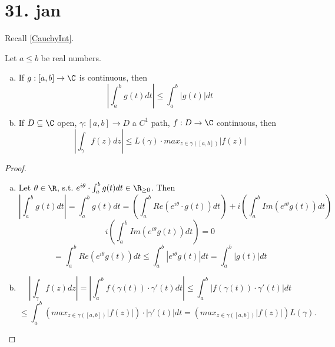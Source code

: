 \section{31. jan}
Recall \ref{CauchyInt}.
\begin{lemma}
  Let $a\leq b $ be real numbers.
  \begin{enumerate}[(a)]
    \item If $g:[a,b]\to \C$ is continuous, then
      $$\left|\int_{a}^{b}g(t)dt\right|\leq \int_{a}^{b}|g(t)|dt$$
    \item If $D\subseteq \C$ open, $\gamma:[a,b]\to D$ a $C^1$ path, $f:D\to \C$ continuous, then
      $$\left|\int_{\gamma}f(z)dz\right|\leq L(\gamma) \cdot max_{z\in \gamma([a,b])}|f(z)|$$
  \end{enumerate}
\end{lemma}
\begin{proof}
  \begin{enumerate}[(a)]
    \item Let $\theta \in \R$, s.t. $e^{i\theta} \cdot \int_{a}^{b}g(t)dt\in \R_{\geq 0}$. Then
      $$\left|\int_{a}^{b}g(t)dt\right|=\int_{a}^{b}g(t)dt=\left(\int_{a}^{b}Re(e^{i\theta} \cdot g(t))dt\right)+i \left(\int_{a}^{b}Im \left(e^{i\theta}g(t)\right)dt\right)$$
      $$i \left(\int_{a}^{b}Im \left(e^{i\theta}g(t)\right)dt\right)=0$$
      $$=\int_{a}^{b}Re \left(e^{i\theta}g(t)\right)dt\leq \int_{a}^{b}|e^{i\theta}g(t)|dt=\int_{a}^{b}|g(t)|dt$$
    \item
      $$\left|\int_{\gamma}f(z)dz\right|=\left|\int_{a}^{b}f(\gamma(t)) \cdot \gamma'(t)dt\right|\leq \int_{a}^{b}|f(\gamma(t)) \cdot\gamma'(t)|dt$$
      $$\leq \int_{a}^{b}\left(max_{z\in \gamma([a,b])}|f(z)|\right) \cdot|\gamma'(t)|dt=\left(max_{z\in \gamma([a,b])}|f(z)|\right)L(\gamma).$$
  \end{enumerate}
\end{proof}

